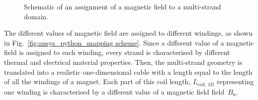 \begin{figure}[H]
    \centering
    \caption{Schematic of an assignment of a magnetic field to a multi-strand domain.}
    \label{fig: 3d_coil_illustation_with_2d_b_field}
\end{figure}

The different values of magnetic field are assigned to different windings, as shown in Fig.~\ref{fig:ansys_python_mapping scheme}. Since a different value of a magnetic field is assigned to each winding, every strand is characterised by different thermal and electrical material properties. Then, the multi-strand geometry is translated into a realistic one-dimensional cable with a length equal to the length of all the windings of a magnet. Each part of this coil length, $L_\text{coil, 1D}$ representing one winding is characterised by a different value of a magnetic field field~$B_\text{n}$.

